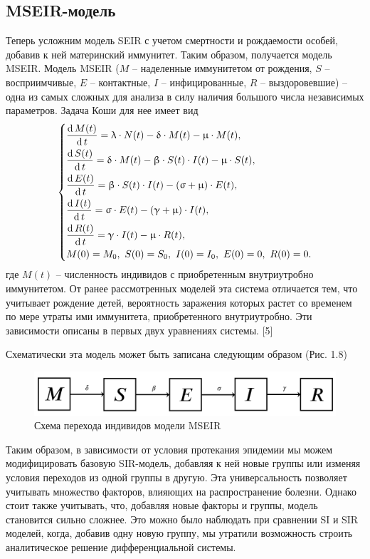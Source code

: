\documentclass[a4paper, 14pt]{extreport}
\renewcommand{\beta}{\upbeta}
\renewcommand{\gamma}{\upgamma}
\renewcommand{\delta}{\updelta}
\renewcommand{\sigma}{\upsigma}
\renewcommand{\lambda}{\uplambda}
\renewcommand{\mu}{\upmu}
\renewcommand{\d}{\operatorname{d}}
\begin{document}
	\subsection{MSEIR-модель}
	Теперь усложним модель SEIR с учетом смертности и рождаемости особей, добавив к ней материнский иммунитет. Таким образом, получается модель MSEIR.
	Модель MSEIR ($M$ -- наделенные иммунитетом от рождения, $S$ -- восприимчивые, $E$ -- контактные, $I$ -- инфицированные, $R$ -- выздоровевшие) -- одна из самых сложных для анализа в силу наличия большого числа независимых параметров. Задача Коши для нее имеет вид
	\begin{equation}
		\begin{dcases}
		\dfrac {\d M(t)}{\d t} = \lambda \cdot N(t) - \delta\cdot M(t)-\mu\cdot M(t),\\
		\dfrac {\d S(t)}{\d t} = \delta \cdot M(t) -\beta\cdot S(t)\cdot I(t) - \mu \cdot S(t),\\
		\dfrac {\d E(t)}{\d t} = \beta \cdot S(t)\cdot I(t) - (\sigma + \mu)\cdot E(t),\\
		\dfrac{\d I(t)}{\d t} =\sigma \cdot E(t) - (\gamma + \mu)\cdot I(t),\\
		\dfrac{\d R(t)}{\d t} = \gamma\cdot I(t) - \mu \cdot R(t),\\
		M(0) = M_0,\ S(0) = S_0,\ I(0) = I_0,\ E(0) = 0,\ R(0) = 0.
		\end{dcases}
	\end{equation}
	где $M (t)$ -- численность индивидов с приобретенным внутриутробно иммунитетом. От ранее рассмотренных моделей эта система отличается тем, что учитывает рождение детей, вероятность заражения которых растет со временем по мере утраты ими иммунитета, приобретенного внутриутробно. Эти зависимости описаны в первых двух уравнениях системы. [5]
	
	Схематически эта модель может быть записана следующим образом (Рис. 1.8)
	\begin{figure}[h!]
		\centering
		\includegraphics[scale=0.3]{images/img10}
		\caption{Схема перехода индивидов модели MSEIR}
		\label{fig:img10}
	\end{figure}
	
	Таким образом, в зависимости от условия протекания эпидемии мы можем модифицировать базовую SIR-модель, добавляя к ней новые группы или изменяя условия переходов из одной группы в другую. Эта универсальность позволяет учитывать множество факторов, влияющих на распространение болезни. Однако стоит также учитывать, что, добавляя новые факторы и группы, модель становится сильно сложнее. Это можно было наблюдать при сравнении SI и SIR моделей, когда, добавив одну новую группу, мы утратили возможность строить аналитическое решение дифференциальной системы.
	
\end{document}
